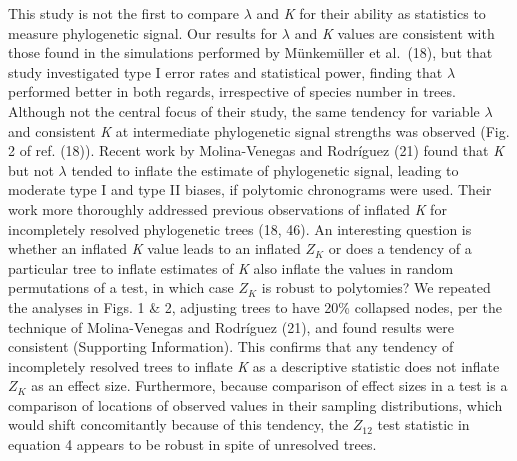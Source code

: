 \documentclass[9pt,twocolumn,twoside,lineno]{pnas-new}
\begin{document}
This study is not the first to compare \(\lambda\) and \emph{K} for
their ability as statistics to measure phylogenetic signal. Our results
for \(\lambda\) and \emph{K} values are consistent with those found in
the simulations performed by Münkemüller et al.~(18), but that study
investigated type I error rates and statistical power, finding that
\(\lambda\) performed better in both regards, irrespective of species
number in trees. Although not the central focus of their study, the same
tendency for variable \(\lambda\) and consistent \emph{K} at
intermediate phylogenetic signal strengths was observed (Fig. 2 of ref.
(18)). Recent work by Molina-Venegas and Rodríguez (21) found that
\emph{K} but not \(\lambda\) tended to inflate the estimate of
phylogenetic signal, leading to moderate type I and type II biases, if
polytomic chronograms were used. Their work more thoroughly addressed
previous observations of inflated \emph{K} for incompletely resolved
phylogenetic trees (18, 46). An interesting question is whether an
inflated \emph{K} value leads to an inflated \(Z_K\) or does a tendency
of a particular tree to inflate estimates of \emph{K} also inflate the
values in random permutations of a test, in which case \(Z_K\) is robust
to polytomies? We repeated the analyses in Figs. 1 \& 2, adjusting trees
to have 20\% collapsed nodes, per the technique of Molina-Venegas and
Rodríguez (21), and found results were consistent (Supporting
Information). This confirms that any tendency of incompletely resolved
trees to inflate \emph{K} as a descriptive statistic does not inflate
\(Z_K\) as an effect size. Furthermore, because comparison of effect
sizes in a test is a comparison of locations of observed values in their
sampling distributions, which would shift concomitantly because of this
tendency, the \(Z_{12}\) test statistic in equation 4 appears to be
robust in spite of unresolved trees.
\end{document}
